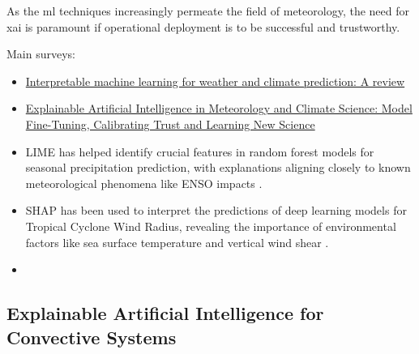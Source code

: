 As the \acrshort{ml} techniques increasingly permeate the field of meteorology, the need for \acrshort{xai} is paramount if operational deployment is to be successful and trustworthy.

Main surveys:
\begin{itemize}
    \item \href{https://www.sciencedirect.com/science/article/pii/S1352231024004722}{Interpretable machine learning for weather and climate prediction: A review}
    \item \href{https://link.springer.com/chapter/10.1007/978-3-031-04083-2_16#Sec2}{Explainable Artificial Intelligence in Meteorology and Climate Science: Model Fine-Tuning, Calibrating Trust and Learning New Science}
\end{itemize}

\begin{itemize}
    \item LIME has helped identify crucial features in random forest models for seasonal precipitation prediction, with explanations aligning closely to known meteorological phenomena like ENSO impacts .
    \item SHAP has been used to interpret the predictions of deep learning models for Tropical Cyclone Wind Radius, revealing the importance of environmental factors like sea surface temperature and vertical wind shear .
    \item 
\end{itemize}

\subsection{Explainable Artificial Intelligence for Convective Systems}

